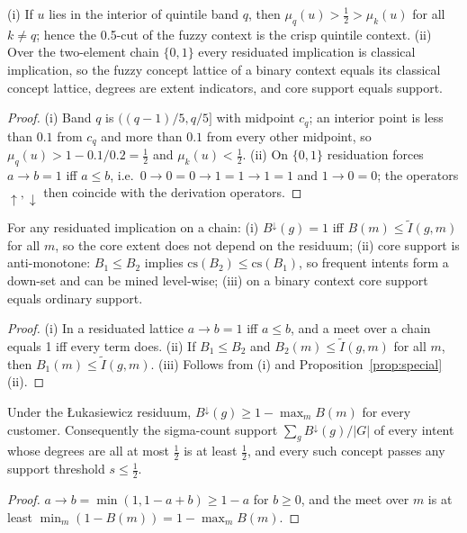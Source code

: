 \begin{proposition}\label{prop:special}
(i) If $u$ lies in the interior of quintile band $q$, then $\mu_q(u) > \tfrac12 > \mu_k(u)$ for all $k \ne q$; hence the 0.5-cut of the fuzzy context is the crisp quintile context. (ii) Over the two-element chain $\{0,1\}$ every residuated implication is classical implication, so the fuzzy concept lattice of a binary context equals its classical concept lattice, degrees are extent indicators, and core support equals support.
\end{proposition}
\begin{proof}
(i) Band $q$ is $((q-1)/5, q/5]$ with midpoint $c_q$; an interior point is less than $0.1$ from $c_q$ and more than $0.1$ from every other midpoint, so $\mu_q(u) > 1 - 0.1/0.2 = \tfrac12$ and $\mu_k(u) < \tfrac12$. (ii) On $\{0,1\}$ residuation forces $a \to b = 1$ iff $a \le b$, i.e.\ $0\to 0 = 0\to1 = 1\to1 = 1$ and $1 \to 0 = 0$; the operators $\uparrow,\downarrow$ then coincide with the derivation operators.
\end{proof}

\begin{proposition}\label{prop:core}
For any residuated implication on a chain: (i) $B^{\downarrow}(g) = 1$ iff $B(m) \le \tilde I(g,m)$ for all $m$, so the core extent does not depend on the residuum; (ii) core support is anti-monotone: $B_1 \le B_2$ implies $\mathrm{cs}(B_2) \le \mathrm{cs}(B_1)$, so frequent intents form a down-set and can be mined level-wise; (iii) on a binary context core support equals ordinary support.
\end{proposition}
\begin{proof}
(i) In a residuated lattice $a \to b = 1$ iff $a \le b$, and a meet over a chain equals 1 iff every term does. (ii) If $B_1 \le B_2$ and $B_2(m) \le \tilde I(g,m)$ for all $m$, then $B_1(m) \le \tilde I(g,m)$. (iii) Follows from (i) and Proposition~\ref{prop:special}(ii).
\end{proof}

\begin{proposition}\label{prop:floor}
Under the Łukasiewicz residuum, $B^{\downarrow}(g) \ge 1 - \max_m B(m)$ for every customer. Consequently the sigma-count support $\sum_g B^{\downarrow}(g)/|G|$ of every intent whose degrees are all at most $\tfrac12$ is at least $\tfrac12$, and every such concept passes any support threshold $s \le \tfrac12$.
\end{proposition}
\begin{proof}
$a \to b = \min(1, 1-a+b) \ge 1-a$ for $b \ge 0$, and the meet over $m$ is at least $\min_m (1 - B(m)) = 1 - \max_m B(m)$.
\end{proof}

